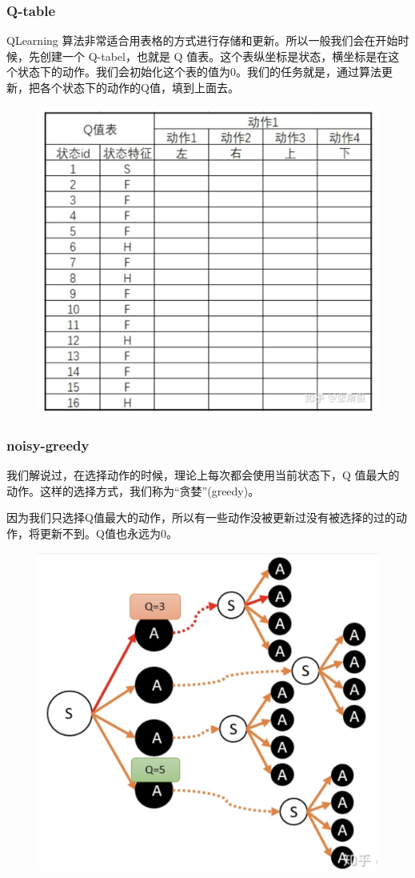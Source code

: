 \documentclass[12pt]{article}
\begin{document}
\subsubsection{Q-table}
QLearning 算法非常适合用表格的方式进行存储和更新。所以一般我们会在开始时候，先创建一个 Q-tabel，也就是 Q 值表。这个表纵坐标是状态，横坐标是在这个状态下的动作。我们会初始化这个表的值为0。我们的任务就是，通过算法更新，把各个状态下的动作的Q值，填到上面去。
\begin{figure}[H]
    \centering
    \includegraphics[width=.6\textwidth]{fig/ReinforcementLearning/RL_QLearning_QTable_Initial.png}
\end{figure}

\subsubsection{noisy-greedy}
我们解说过，在选择动作的时候，理论上每次都会使用当前状态下，Q 值最大的动作。这样的选择方式，我们称为“贪婪”(greedy)。

因为我们只选择Q值最大的动作，所以有一些动作没被更新过没有被选择的过的动作，将更新不到。Q值也永远为0。
\begin{figure}[H]
    \centering
    \includegraphics[width=.4\textwidth]{fig/ReinforcementLearning/RL_QLearning_Noisy_Greedy.png}
\end{figure}
\end{document}
